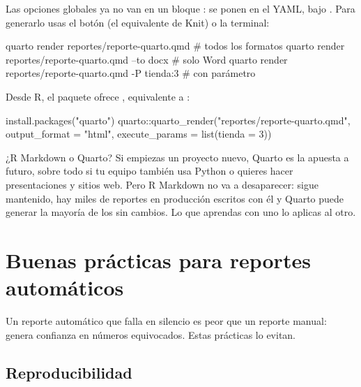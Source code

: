 Las opciones globales ya no van en un bloque : se ponen en el
YAML, bajo . Para generarlo usas el botón  (el
equivalente de Knit) o la terminal:

\begin{textocodigo}
quarto render reportes/reporte-quarto.qmd              # todos los formatos
quarto render reportes/reporte-quarto.qmd --to docx   # solo Word
quarto render reportes/reporte-quarto.qmd -P tienda:3 # con parámetro
\end{textocodigo}

Desde R, el paquete  ofrece ,
equivalente a :

\begin{rnoejecutar}
install.packages("quarto")
quarto::quarto_render("reportes/reporte-quarto.qmd",
                      output_format = "html",
                      execute_params = list(tienda = 3))
\end{rnoejecutar}

\begin{consejo}
¿R Markdown o Quarto? Si empiezas un proyecto nuevo, Quarto es la apuesta a
futuro, sobre todo si tu equipo también usa Python o quieres hacer
presentaciones y sitios web. Pero R Markdown no va a desaparecer: sigue
mantenido, hay miles de reportes en producción escritos con él y Quarto
puede generar la mayoría de los  sin cambios. Lo que aprendas
con uno lo aplicas al otro.
\end{consejo}

\section{Buenas prácticas para reportes automáticos}
\label{sec:m8-buenas-practicas}

Un reporte automático que falla en silencio es peor que un reporte manual:
genera confianza en números equivocados. Estas prácticas lo evitan.

\subsection{Reproducibilidad}

